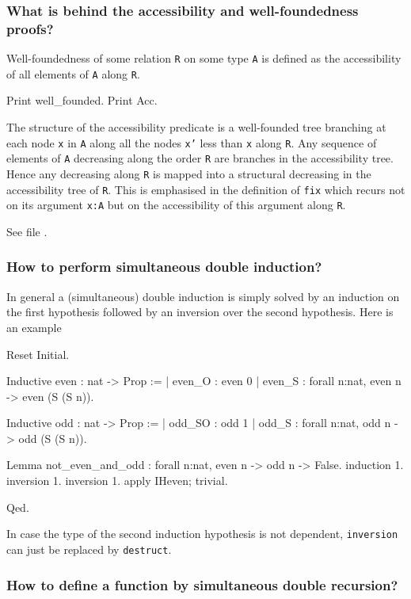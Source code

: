 \documentclass[a4paper,pdftex]{article}
\def\Question#1{\stepcounter{question}\subsubsection{#1}}
\newcommand\vfile[2]{\ahref{#1}{\tt {#2}.v}}
\begin{document}
\Question{What is behind the accessibility and well-foundedness proofs?}

 Well-foundedness of some relation {\tt R} on some type {\tt A}
is defined as the accessibility of all elements of {\tt A} along {\tt R}.

\begin{coq_example}
Print well_founded.
Print Acc.
\end{coq_example}

The structure of the accessibility predicate is a well-founded tree
branching at each node {\tt x} in {\tt A} along all the nodes {\tt x'}
less than {\tt x} along {\tt R}. Any sequence of elements of {\tt A}
decreasing along the order {\tt R} are branches in the accessibility
tree. Hence any decreasing along {\tt R} is mapped into a structural
decreasing in the accessibility tree of {\tt R}. This is emphasised in
the definition of {\tt fix} which recurs not on its argument {\tt x:A}
but on the accessibility of this argument along {\tt R}.

See file \vfile{\InitWf}{Wf}.

\Question{How to perform simultaneous double induction?}

 In general a (simultaneous) double induction is simply solved by an
induction on the first hypothesis followed by an inversion over the
second hypothesis. Here is an example

\begin{coq_eval}
Reset Initial.
\end{coq_eval}

\begin{coq_example}
Inductive even : nat -> Prop :=
  | even_O : even 0
  | even_S : forall n:nat, even n -> even (S (S n)).

Inductive odd : nat -> Prop :=
  | odd_SO : odd 1
  | odd_S : forall n:nat, odd n -> odd (S (S n)).

Lemma not_even_and_odd : forall n:nat, even n -> odd n -> False.
induction 1.
  inversion 1.
  inversion 1. apply IHeven; trivial.
\end{coq_example}
\begin{coq_example*}
Qed.
\end{coq_example*}

In case the type of the second induction hypothesis is not
dependent, {\tt inversion} can just be replaced by {\tt destruct}.

\Question{How to define a function by simultaneous double recursion?}
\end{document}
